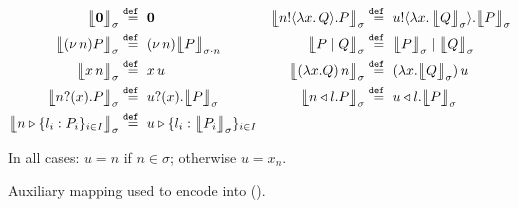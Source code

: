 \begin{figure}[t!]
	\begin{align*}
		\auxmapp{\inact}{{}}{\sigma}  & \defeq  \inact
		&
		\auxmapp{\bout{n}{\abs{x}{Q}} P}{{}}{\sigma} & \defeq \bout{u}{\abs{x}{\auxmapp{Q}{{}}{\sigma}}} \auxmapp{P}{{}}{\sigma}
		\\
		\auxmapp{\news{n} P}{{}}{\sigma} & \defeq \news{n} \auxmapp{P}{{}}{{\sigma \cat n}}
		&
		\auxmapp{P \Par Q}{{}}{\sigma} & \defeq \auxmapp{P}{{}}{\sigma} \Par \auxmapp{Q}{{}}{\sigma} 
		\\
		\auxmapp{\appl{x}{n}}{{}}{\sigma} & \defeq \appl{x}{u}
		&
		\auxmapp{\appl{(\lambda x.Q)}{n}}{{}}{\sigma}  & \defeq \appl{(\lambda x.\auxmapp{Q}{{}}{\sigma})}{u}
		\\
		\auxmapp{\binp{n}{x} P}{{}}{\sigma} & \defeq \binp{u}{x} \auxmapp{P}{{}}{\sigma} 
		&
		\auxmapp{\bsel{n}{l} P}{{}}{\sigma} & \defeq \bsel{u}{l} \auxmapp{P}{{}}{\sigma} 
		\\
		\auxmapp{\bbra{n}{l_i:P_i}_{i \in I}}{{}}{\sigma} & \defeq \bbra{u}{l_i:\auxmapp{P_i}{{}}{\sigma}}_{i \in I}
\end{align*}
\begin{center}
	{In all cases: $u = n$ if $n\in \sigma$; otherwise $u = x_n$.}
\end{center}
\caption{\label{f:auxmap} Auxiliary mapping used to encode \HOp into \HO ().}
\end{figure}


